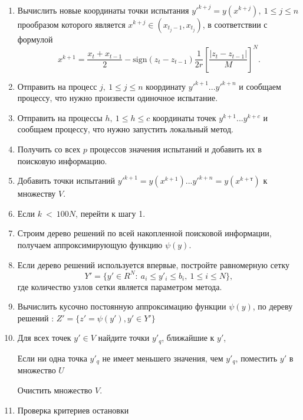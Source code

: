 \documentclass[runningheads]{llncs}
\begin{document}
\begin{enumerate}
	\item Вычислить новые координаты точки испытания $y'^{k+j}=y\left(x^{k+j}\right), \ 1\leq j\leq n$ прообразом которого является $x^{k+j}\in\left(x_{t_j-1},x_{t_j}\right)$, в соответствии с формулой
	\begin{equation}
		\label{agp5_x1}
		x^{k+1}=\frac{x_t+x_{t-1}}{2}-\mathrm{sign}\left(z_t-z_{t-1}\right)\frac{1}{2r}\left[\frac{\left|z_t-z_{t-1}\right|}{M}\right]^N.
	\end{equation}	
	
	
	\item Отправить на процесс $j, \ 1\leq j\leq n$ координату $y'^{k+1} ... y'^{k+n}$  и сообщаем процессу, что нужно произвести одиночное испытание.
	
	\item Отправить на процессы $h, \ 1\leq h\leq c$ координаты точек $y^{k+1} ... y^{k+c}$ и сообщаем процессу, что нужно запустить локальный метод.
	
	\item Получить со всех $p$ процессов значения испытаний и добавить их в поисковую информацию.
	
	\item Добавить точки испытаний $y'^{k+1}=y\left(x^{k+1}\right) ... y'^{k+n}=y\left(x^{k+т}\right)$ к множеству $V$.
	
	\item Если $k\ <\ 100 N$, перейти к шагу 1.
	
	
	\item Строим дерево решений по всей накопленной поисковой информации, получаем аппроксимирующую функцию $\psi(y)$.
	
	\item Если дерево решений используется впервые, постройте равномерную сетку
	\begin{displaymath} 
		Y'=\{ y'\in R^N:\ a_i\le y'_i \le b_i,\ 1\le i\le N \},
	\end{displaymath} 
	где количество узлов сетки является параметром метода.
	
	\item Вычислить кусочно постоянную аппроксимацию функции $\psi(y)$, по дереву решений : $Z' = \{ z'=  \psi(y'), y' \in Y'\}$
	
	\item Для всех точек $y'\in V$ найдите точки $y'_q$, ближайшие к $y'$,
	
	Если ни одна точка $y'_q$ не имеет меньшего значения, чем $y'_q$, поместить $y'$ в множество $U$
	
	Очистить множество $V$.
	
	\item Проверка критериев остановки
	
	
\end{enumerate}
\end{document}
